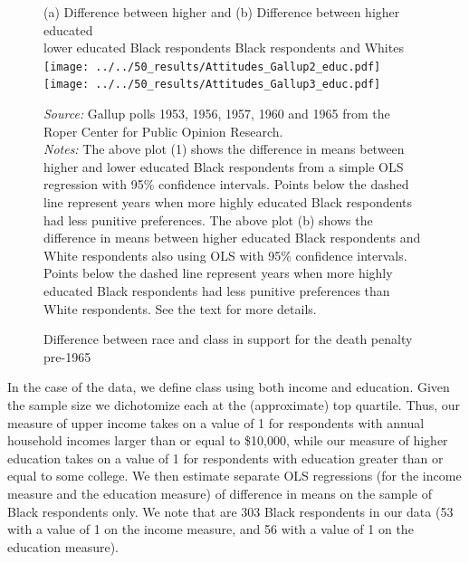 \documentclass[12pt]{article}
\begin{document}
\begin{figure}[h!]
 \begin{center}
 \caption{Difference between race and class in support for the death penalty pre-1965}
 \smallskip \smallskip
 \small
		(a) Difference between higher and   \hspace*{1.2in} (b) Difference between higher educated \\
		lower educated Black respondents \hspace*{1.2in}  Black respondents and Whites \\

			\texttt{[image: ../../50\_results/Attitudes\_Gallup2\_educ.pdf]}
			\texttt{[image: ../../50\_results/Attitudes\_Gallup3\_educ.pdf]}
			\label{figure_attitudes_gallup2}
			 \end{center}
{\scriptsize{\emph{Source:} Gallup polls 1953, 1956, 1957, 1960 and 1965 from the Roper Center for Public Opinion Research.  }} \\
{\scriptsize{\emph{Notes:} The above plot (1) shows the difference in means between higher and lower educated Black respondents from a simple OLS regression with 95\% confidence intervals.  Points below the dashed line represent years when more highly educated Black respondents had less punitive preferences. The above plot (b) shows the difference in means between higher educated Black respondents and White respondents also using OLS with 95\% confidence intervals.  Points below the dashed line represent years when more highly educated Black respondents had less punitive preferences than White respondents.  See the text for more details. \singlespacing }}
			\end{figure} \normalsize


In the case of the  data, we define class using both income and education.  Given the sample size we dichotomize each at the (approximate) top quartile. Thus, our measure of upper income takes on a value of 1 for respondents with annual household incomes larger than or equal to \$10,000, while our measure of higher education takes on a value of 1 for respondents with education greater than or equal to some college.  We then estimate separate OLS regressions (for the income measure and the education measure) of difference in means on the sample of Black respondents only.  We note that are 303 Black respondents in our data (53 with a value of 1 on the income measure, and 56 with a value of 1 on the education measure).
\end{document}
